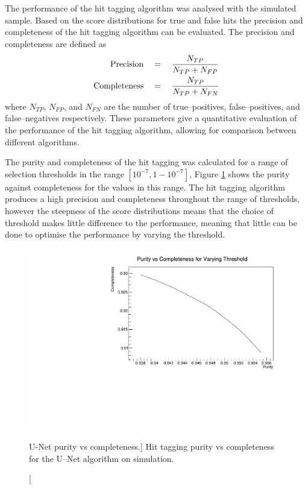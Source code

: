 The performance of the hit tagging algorithm was analysed with the simulated
sample. Based on the score distributions for true and false hits the precision 
and completeness of the hit tagging algorithm can be evaluated. The precision 
and completeness are defined as 
\begin{align}
	\mbox{Precision} \quad &= \quad  \frac{N_{TP}}{N_{TP} + N_{FP}} \\
	\vspace{2mm}
	\mbox{Completeness} \quad &= \quad \frac{N_{TP}}{N_{TP} + N_{FN}}
\end{align}
where $N_{TP}$, $N_{FP}$, and $N_{FN}$ are the number of true--positives,
false--positives, and false--negatives respectively. These parameters give a
quantitative evaluation of the performance of the hit tagging algorithm,
allowing for comparison between different algorithms. 

The purity and completeness of the hit tagging was calculated for a range of 
selection thresholds in the range $[10^{-7}, 1 - 10^{-7}]$, Figure 
\ref{fig:unet_pur_comp} shows the purity against completeness for the values 
in this range. The hit tagging algorithm produces a high precision and 
completeness throughout the range of thresholds, however the steepness of the 
score distributions means that the choice of threshold makes little difference 
to the performance, meaning that little can be done to optimise the performance
by varying the threshold.
\begin{figure}
	\centering
	\includegraphics[width=\textwidth]{figures/unet_pur_v_comp.pdf}
	\caption
	[U-Net purity vs completeness.]
	{Hit tagging purity vs completeness for the U--Net algorithm on \protodune{}
	simulation.}
	\label{fig:unet_pur_comp}
\end{figure}

